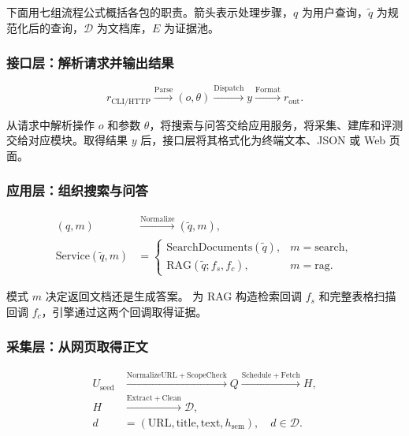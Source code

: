 \documentclass[UTF8,zihao=-4,fontset=fandol]{ctexart}
\begin{document}
下面用七组流程公式概括各包的职责。箭头表示处理步骤，$q$ 为用户查询，$\tilde q$ 为规范化后的查询，$\mathcal D$ 为文档库，$E$ 为证据池。

\subsubsection*{接口层：解析请求并输出结果}

\begin{equation}
r_{\mathrm{CLI/HTTP}}
\xrightarrow{\mathrm{Parse}}(o,\theta)
\xrightarrow{\mathrm{Dispatch}}y
\xrightarrow{\mathrm{Format}}r_{\mathrm{out}}.
\label{eq:architecture-interfaces}
\end{equation}

 从请求中解析操作 $o$ 和参数 $\theta$，将搜索与问答交给应用服务，将采集、建库和评测交给对应模块。取得结果 $y$ 后，接口层将其格式化为终端文本、JSON 或 Web 页面。

\subsubsection*{应用层：组织搜索与问答}

\begin{equation}
\begin{aligned}
(q,m)&\xrightarrow{\mathrm{Normalize}}(\tilde q,m),\\
\mathrm{Service}(\tilde q,m)&=
\begin{cases}
\mathrm{SearchDocuments}(\tilde q),&m=\mathrm{search},\\
\mathrm{RAG}(\tilde q;f_s,f_c),&m=\mathrm{rag}.
\end{cases}
\end{aligned}
\label{eq:architecture-application}
\end{equation}

模式 $m$ 决定返回文档还是生成答案。 为 RAG 构造检索回调 $f_s$ 和完整表格扫描回调 $f_c$，引擎通过这两个回调取得证据。

\subsubsection*{采集层：从网页取得正文}

\begin{equation}
\begin{aligned}
U_{\mathrm{seed}}
&\xrightarrow{\mathrm{NormalizeURL+ScopeCheck}}Q
\xrightarrow{\mathrm{Schedule+Fetch}}H,\\
H&\xrightarrow{\mathrm{Extract+Clean}}\mathcal D,\\
d&=(\mathrm{URL},\mathrm{title},\mathrm{text},h_{\mathrm{sem}}),\quad d\in\mathcal D.
\end{aligned}
\label{eq:architecture-ingestion}
\end{equation}
\end{document}
